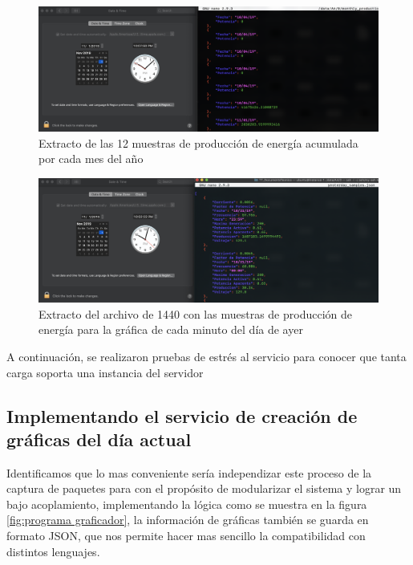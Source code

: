 \begin{figure}[H]
	\centering
	\includegraphics[scale=.3]{Capitulo5/images/monthly.png}
	\caption{Extracto de las 12 muestras de producción de energía acumulada por cada mes del año}
	\label{fig:}
\end{figure} 


\begin{figure}[H]
	\centering
	\includegraphics[scale=.3]{Capitulo5/images/yesterday.png}
	\caption{Extracto del archivo de 1440 con las muestras de producción de energía para la gráfica de cada minuto del día de ayer}
	\label{fig:}
\end{figure} 

A continuación, se realizaron pruebas de estrés al servicio para conocer que tanta carga soporta una instancia del servidor


\subsection{Implementando el servicio de creación de gráficas del día actual}

Identificamos que lo mas conveniente sería independizar este proceso de la captura de paquetes para con el propósito de modularizar el sistema y lograr un bajo acoplamiento, implementando la lógica como se muestra en la figura \ref{fig:programa graficador}, la información de gráficas también se guarda en formato JSON, que nos permite hacer mas sencillo la compatibilidad con distintos lenguajes.

